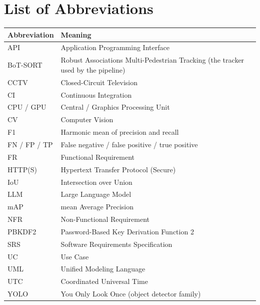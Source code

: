 \chapter*{List of Abbreviations}
\begin{longtable}{P{0.2\textwidth}P{0.7\textwidth}}
\toprule
Abbreviation & Meaning\\
\midrule
API & Application Programming Interface\\
BoT-SORT & Robust Associations Multi-Pedestrian Tracking (the tracker used by the pipeline)\\
CCTV & Closed-Circuit Television\\
CI & Continuous Integration\\
CPU / GPU & Central / Graphics Processing Unit\\
CV & Computer Vision\\
F1 & Harmonic mean of precision and recall\\
FN / FP / TP & False negative / false positive / true positive\\
FR & Functional Requirement\\
HTTP(S) & Hypertext Transfer Protocol (Secure)\\
IoU & Intersection over Union\\
LLM & Large Language Model\\
mAP & mean Average Precision\\
NFR & Non-Functional Requirement\\
PBKDF2 & Password-Based Key Derivation Function 2\\
SRS & Software Requirements Specification\\
UC & Use Case\\
UML & Unified Modeling Language\\
UTC & Coordinated Universal Time\\
YOLO & You Only Look Once (object detector family)\\
\bottomrule
\end{longtable}

